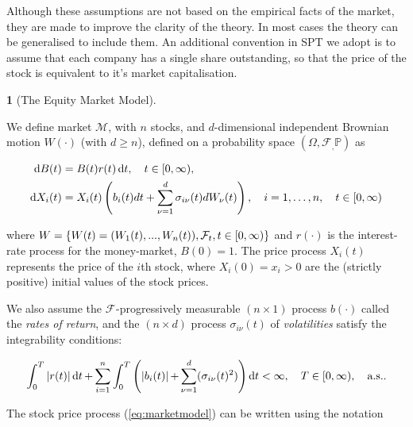 \documentclass[british]{amsart} \usepackage{lmodern}
\numberwithin{equation}{section} \numberwithin{figure}{section}
\theoremstyle{plain} \newtheorem{thm}{\protect\theoremname}[section]
\theoremstyle{definition} \newtheorem{defn}[thm]{\protect\definitionname}
\theoremstyle{plain} \newtheorem{assumption}[thm]{\protect\assumptionname}
\theoremstyle{plain} \newtheorem{lem}[thm]{\protect\lemmaname}
\theoremstyle{plain} \newtheorem{prop}[thm]{\protect\propositionname}
\theoremstyle{remark} \newtheorem{rem}[thm]{\protect\remarkname}
\theoremstyle{plain} \newtheorem{cor}[thm]{\protect\corollaryname}
\renewcommand{\d}[1]{\mathop{\mathrm{d}{#1}}}
\newcommand{\filtration}[1]{\mathcal{F}_{#1}}
\newcommand{\abs}[1]{\mathop{|{#1}|}} \newcommand{\market}{\mathcal{M}}
\newcommand{\rangei}{i=1,\dots,n} \newcommand{\measure}{\mathbb{P}}
\newcommand{\probabilityspace}{(\Omega,\filtration,\measure)}
\begin{document}
Although these assumptions are not based on the empirical facts of the market,
they are made to improve the clarity of the theory. In most cases the theory can
be generalised to include them. An additional convention in SPT we adopt is to
assume that each company has a single share outstanding, so that the price of
the stock is equivalent to it's market capitalisation.

\begin{defn} [The Equity Market Model]
  \label{def:marketmodel}

  We define market $\market$, with $n$ stocks, and $d$-dimensional independent
  Brownian motion $W(\cdot)$ (with $d \ge n$), defined on a probability space 
  $\probabilityspace$ as

  \begin{gather}
    \label{eq:marketmodel}
    \begin{split}
      \d{B(t)} &= B(t)r(t)\d{t},  
        \quad \ranget, \\
      \d{X_{i}(t)} &= 
            X_{i}(t) 
            \left(
                b_{i}(t)dt + \sum_{\nu=1}^{d} \sigma_{i\nu}(t) dW_{\nu}(t)
            \right),
        \quad \rangei,
        \quad \ranget
    \end{split}
  \end{gather}

  where $W = \left\{ W(t)=(W_{1}(t),...,W_{n}(t)),\filtration{t},\ranget \right\}$
  and $r(\cdot)$ is the interest-rate process for the money-market, $B(0)=1$. The
  price process $X_{i}(t)$ represents the price of the $i$th stock, where
  $X_{i}(0) = x_{i} > 0$ are the (strictly positive) initial values of the stock
  prices.

  We also assume the $\filtration{}$-progressively measurable $(n \times 1)$
  process $b(\cdot)$ called the \textit{rates of return}, and the $(n \times d)$
  process $\sigma_{i\nu}(t)$ of \textit{volatilities} satisfy the integrability
  conditions: 

  \begin{equation*}
    \int_{0}^{T} 
    \abs{r(t)} 
    \d{t} +
    \sum_{i=1}^{n} \int_{0}^{T} 
      \left( 
          \abs{b_{i}(t)} +
          \sum_{\nu=1}^{d} ( \sigma_{i\nu}(t)^2  ) 
          \right) \d{t} < \infty,
    \quad T \in [0, \infty),
    \quad \almostsurely.
   \end{equation*}

\end{defn}

The stock price process (\ref{eq:marketmodel}) can be written using the notation 
\end{document}
